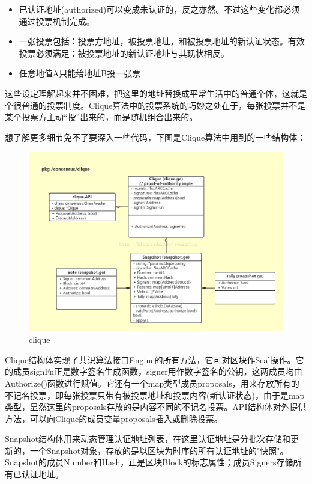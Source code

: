 \documentclass[UTF8]{ctexart}
\begin{document}
{\begin{itemize}
\item 已认证地址(authorized)可以变成未认证的，反之亦然。不过这些变化都必须通过投票机制完成。

\item 一张投票包括：投票方地址，被投票地址，和被投票地址的新认证状态。有效投票必须满足：被投票地址的新认证地址与其现状相反。

\item 任意地值A只能给地址B投一张票
\end{itemize}

这些设定理解起来并不困难，把这里的地址替换成平常生活中的普通个体，这就是个很普通的投票制度。Clique算法中的投票系统的巧妙之处在于，每张投票并不是某个投票方主动“投”出来的，而是随机组合出来的。

想了解更多细节免不了要深入一些代码，下图是Clique算法中用到的一些结构体：

\begin{figure}
	\centering
	\includegraphics[scale=0.4]{clique.png}
	\caption{clique}
	\label{clique}
\end{figure}

Clique结构体实现了共识算法接口Engine的所有方法，它可对区块作Seal操作。它的成员signFn正是数字签名生成函数，signer用作数字签名的公钥，这两成员均由Authorize()函数进行赋值。它还有一个map类型成员proposals，用来存放所有的不记名投票，即每张投票只带有被投票地址和投票内容(新认证状态)，由于是map类型，显然这里的proposals存放的是内容不同的不记名投票。API结构体对外提供方法，可以向Clique的成员变量proposals插入或删除投票。

Snapshot结构体用来动态管理认证地址列表，在这里认证地址是分批次存储和更新的，一个Snapshot对象，存放的是以区块为时序的所有认证地址的"快照"。Snapshot的成员Number和Hash，正是区块Block的标志属性；成员Signers存储所有已认证地址。

}
\end{document}

